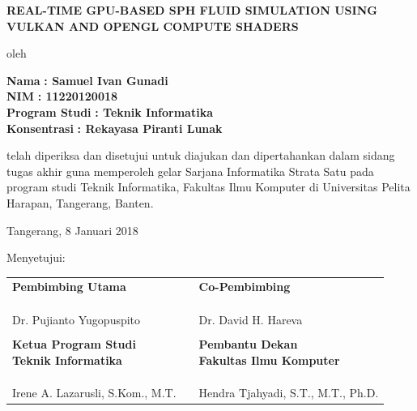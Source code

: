 \documentclass[a4paper, 12pt, oneside]{book}
\begin{document}
\begin{onehalfspace}
    \begin{center}
        {\bfseries\MakeTextUppercase{Real-Time GPU-Based SPH Fluid Simulation Using Vulkan and OpenGL Compute Shaders}}
        
        oleh
        
    \end{center}
    
    \begin{tabbing}
        \hspace{3cm}\=\textbf{Nama} \hspace{2cm}\= \textbf{: Samuel Ivan Gunadi} \\
        \>\textbf{NIM} \> \textbf{: 11220120018} \\
        \>\textbf{Program Studi} \> \textbf{: Teknik Informatika} \\
        \>\textbf{Konsentrasi} \> \textbf{: Rekayasa Piranti Lunak}
    \end{tabbing}
    telah diperiksa dan disetujui untuk diajukan dan dipertahankan dalam sidang tugas akhir guna memperoleh gelar Sarjana Informatika Strata Satu pada program studi Teknik Informatika, Fakultas Ilmu Komputer di Universitas Pelita Harapan, Tangerang, Banten.

    \begin{center}
        Tangerang, 8 Januari 2018
        
        Menyetujui:
        
        \vspace{1 cm}
        \begin{tabu} to 
            \textbf{Pembimbing Utama} & & \textbf{Co-Pembimbing} \\
            \\
            \\
            \\
            Dr. Pujianto Yugopuspito & & Dr. David H. Hareva \\
            \\
            \textbf{Ketua Program Studi \newline Teknik Informatika} & & \textbf{Pembantu Dekan \newline Fakultas Ilmu Komputer} \\
            \\
            \\
            \\
            Irene A. Lazarusli, S.Kom., M.T. & & Hendra Tjahyadi, S.T., M.T., Ph.D.
        \end{tabu}
    \end{center}
\end{onehalfspace}
\clearpage
\end{document}
